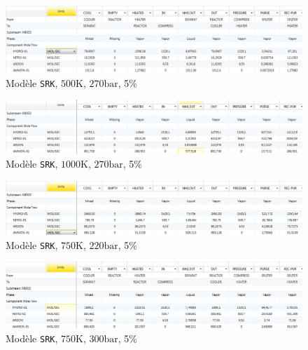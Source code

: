 \begin{figure}[h!]
	\begin{center}
		\includegraphics[scale=0.5]{../tache2/img_aspen/SRK,500,270.png}
	\end{center}
	\caption{Modèle \texttt{SRK}, $500\si{\kelvin}$, $270\si{\bar}$, 5\%}
	\label{fig:SRK,500,270,0.05}
\end{figure}

\begin{figure}[h!]
	\begin{center}
		\includegraphics[scale=0.5]{../tache2/img_aspen/SRK,1000,270.png}
	\end{center}
	\caption{Modèle \texttt{SRK}, $1000\si{\kelvin}$, $270\si{\bar}$, 5\%}
	\label{fig:SRK,1000,270,0.05}
\end{figure}

\begin{figure}[h!]
	\begin{center}
		\includegraphics[scale=0.5]{../tache2/img_aspen/SRK,750,220.png}
	\end{center}
	\caption{Modèle \texttt{SRK}, $750\si{\kelvin}$, $220\si{\bar}$, 5\%}
	\label{fig:SRK,750,220,0.05}
\end{figure}

\begin{figure}[h!]
	\begin{center}
		\includegraphics[scale=0.5]{../tache2/img_aspen/SRK,750,300.png}
	\end{center}
	\caption{Modèle \texttt{SRK}, $750\si{\kelvin}$, $300\si{\bar}$, 5\%}
	\label{fig:SRK,750,300,0.05}
\end{figure}


